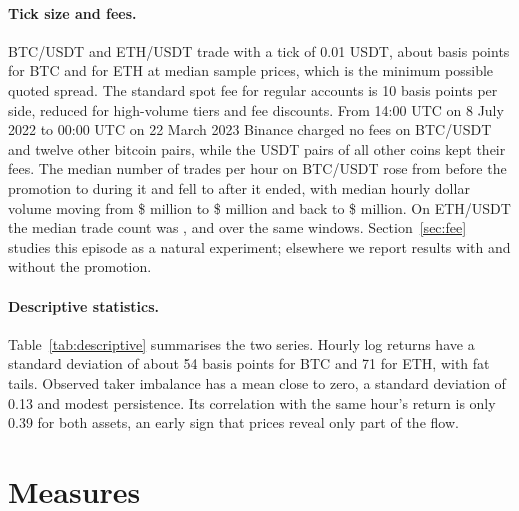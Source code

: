 \documentclass[11pt]{article}
\newcommand{\tabnote}[1]{\par\vspace{2pt}{\footnotesize\noindent #1\par}}
\begin{document}
\paragraph{Tick size and fees.} BTC/USDT and ETH/USDT trade with a tick of 0.01 USDT, about
\BTCtick{} basis points for BTC and \ETHtick{} for ETH at median sample prices, which is the minimum
possible quoted spread. The standard spot fee for regular accounts is 10 basis points per side,
reduced for high-volume tiers and fee discounts. From 14:00 UTC on 8 July 2022 to 00:00 UTC on
22 March 2023 Binance charged no fees on BTC/USDT and twelve other bitcoin pairs, while the USDT
pairs of all other coins kept their fees. The median number of trades per hour on BTC/USDT rose from
\BTCtradesPre{} before the promotion to \BTCtradesZero{} during it and fell to \BTCtradesPost{} after
it ended, with median hourly dollar volume moving from \$\BTCdvolPre{} million to \$\BTCdvolZero{}
million and back to \$\BTCdvolPost{} million. On ETH/USDT the median trade count was \ETHtradesPre{},
\ETHtradesZero{} and \ETHtradesPost{} over the same windows. Section~\ref{sec:fee} studies this episode
as a natural experiment; elsewhere we report results with and without the promotion.

\paragraph{Descriptive statistics.} Table~\ref{tab:descriptive} summarises the two series. Hourly
log returns have a standard deviation of about 54 basis points for BTC and 71 for ETH, with fat
tails. Observed taker imbalance has a mean close to zero, a standard deviation of 0.13 and modest
persistence. Its correlation with the same hour's return is only 0.39 for both assets, an early sign
that prices reveal only part of the flow.

\begin{table}[t]
\centering\caption{Descriptive statistics, hourly bars}\label{tab:descriptive}
\resizebox{\textwidth}{!}{}
\tabnote{$\sigma(r)$: standard deviation of hourly and four-hour log returns in basis points.
\$vol: quote (USDT) volume per hour. Imb.: observed taker imbalance $(2B_t-V_t)/V_t$; AC(1) is its
first-order autocorrelation.}
\end{table}

\section{Measures}\label{sec:measures}
\end{document}
